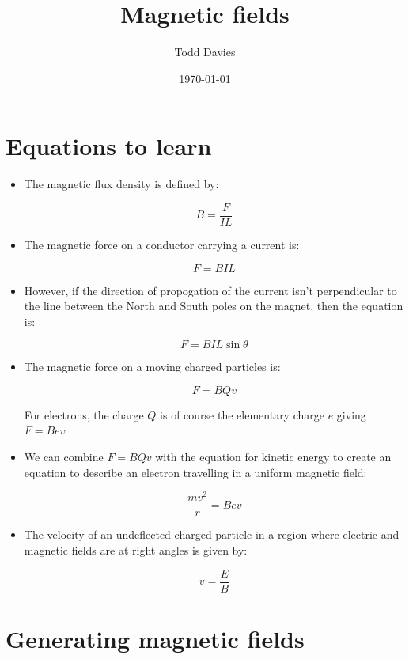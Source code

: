 \documentclass{article}
\title{Magnetic fields}
\author{Todd Davies}
\date{\today}
\begin{document}
\lhead{\today}

\maketitle

\section*{Equations to learn}
\thispagestyle{empty}

\begin{itemize}
	
	\item The magnetic flux density is defined by:
	
	\[
		B = \frac{F}{IL}
	\]

	\item The magnetic force on a conductor carrying a current is:
	
	\[
		F=BIL
	\]

	\item However, if the direction of propogation of the current isn't
	perpendicular to the line between the North and South poles on the magnet,
	then the equation is:

	\[
		F=BIL\sin{\theta}
	\]

	\item The magnetic force on a moving charged particles is:

	\[
		F=BQv
	\]

	For electrons, the charge $Q$ is of course the elementary charge $e$ giving
	$F=Bev$

    \item We can combine $F=BQv$ with the equation for kinetic energy to create
	an equation to describe an electron travelling in a uniform magnetic field:

	\[
		\frac{mv^2}{r} = Bev
	\]

	\item The velocity of an undeflected charged particle in a region where
	electric and magnetic fields are at right angles is given by:

	\[
		v = \frac{E}{B}
	\]

\end{itemize}

\section*{Generating magnetic fields}
\end{document}
